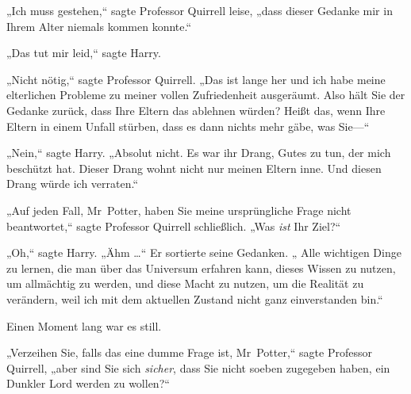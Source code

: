 „Ich muss gestehen,“ sagte Professor Quirrell leise, „dass dieser Gedanke mir in Ihrem Alter niemals kommen konnte.“

„Das tut mir leid,“ sagte Harry.

„Nicht nötig,“ sagte Professor Quirrell. „Das ist lange her und ich habe meine elterlichen Probleme zu meiner vollen Zufriedenheit ausgeräumt. Also hält Sie der Gedanke zurück, dass Ihre Eltern das ablehnen würden? Heißt das, wenn Ihre Eltern in einem Unfall stürben, dass es dann nichts mehr gäbe, was Sie—“

„Nein,“ sagte Harry. „Absolut nicht. Es war ihr Drang, Gutes zu tun, der mich beschützt hat. Dieser Drang wohnt nicht nur meinen Eltern inne. Und diesen Drang würde ich verraten.“

„Auf jeden Fall, Mr~Potter, haben Sie meine ursprüngliche Frage nicht beantwortet,“ sagte Professor Quirrell schließlich. „Was \emph{ist} Ihr Ziel?“

„Oh,“ sagte Harry. „Ähm …“ Er sortierte seine Gedanken. „ Alle wichtigen Dinge zu lernen, die man über das Universum erfahren kann, dieses Wissen zu nutzen, um allmächtig zu werden, und diese Macht zu nutzen, um die Realität zu verändern, weil ich mit dem aktuellen Zustand nicht ganz einverstanden bin.“

Einen Moment lang war es still.

„Verzeihen Sie, falls das eine dumme Frage ist, Mr~Potter,“ sagte Professor Quirrell, „aber sind Sie sich \emph{sicher}, dass Sie nicht soeben zugegeben haben, ein Dunkler Lord werden zu wollen?“

